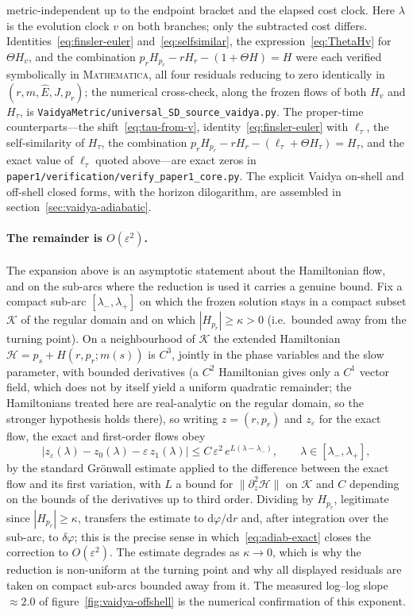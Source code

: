 \documentclass[12pt]{iopart}
\newcommand{\Ehat}{\hat E}
\newcommand{\dd}{\mathrm{d}}
\theoremstyle{plain}
\theoremstyle{definition}
\theoremstyle{plain}
\theoremstyle{remark}
\begin{document}
metric-independent up to the endpoint bracket and the elapsed cost clock. Here $\lambda$ is
the evolution clock $v$ on both branches; only the subtracted cost differs. Identities~\eqref{eq:finsler-euler}
and~\eqref{eq:selfsimilar}, the expression~\eqref{eq:ThetaHv} for $\Theta H_v$, and the
combination $p_rH_{p_r}-rH_r-(1+\Theta H)=H$ were each verified symbolically in
\textsc{Mathematica}, all four residuals reducing to zero identically in
$(r,m,\Ehat,J,p_r)$; the numerical cross-check, along the frozen flows of both $H_v$ and
$H_\tau$, is \texttt{VaidyaMetric/universal\_SD\_source\_vaidya.py}. The proper-time counterparts---the
shift~\eqref{eq:tau-from-v}, identity~\eqref{eq:finsler-euler} with $\ell_\tau$, the
self-similarity of $H_\tau$, the combination
$p_rH_{p_r}-rH_r-(\ell_\tau+\Theta H_\tau)=H_\tau$, and the exact value of $\ell_\tau$ quoted
above---are exact zeros in \texttt{paper1/verification/verify\_paper1\_core.py}. The explicit Vaidya on-shell and
off-shell closed forms, with the horizon dilogarithm, are assembled in
section~\ref{sec:vaidya-adiabatic}.

\paragraph{The remainder is $O(\varepsilon^2)$.} The expansion above is an asymptotic
statement about the Hamiltonian flow, and on the sub-arcs where the reduction is used it
carries a genuine bound. Fix a compact sub-arc $[\lambda_-,\lambda_+]$ on which the frozen
solution stays in a compact subset $\mathcal K$ of the regular domain and on which
$|H_{p_r}|\ge\kappa>0$ (i.e.\ bounded away from the turning point). On a neighbourhood of
$\mathcal K$ the extended Hamiltonian $\mathcal H=p_s+H(r,p_r;m(s))$ is $C^3$, jointly in
the phase variables and the slow parameter, with bounded derivatives (a $C^2$ Hamiltonian
gives only a $C^1$ vector field, which does not by itself yield a uniform quadratic
remainder; the Hamiltonians treated here are real-analytic on the regular domain, so the
stronger hypothesis holds there), so writing $z=(r,p_r)$ and $z_\varepsilon$ for the exact flow, the exact and
first-order flows obey
\[
   \big|z_\varepsilon(\lambda)-z_0(\lambda)-\varepsilon\,z_1(\lambda)\big|
   \le C\,\varepsilon^{2}\,e^{L(\lambda-\lambda_-)} ,
   \qquad \lambda\in[\lambda_-,\lambda_+],
\]
by the standard Gr\"onwall estimate applied to the difference between the exact flow and
its first variation, with $L$ a bound for $\|\partial_z^2\mathcal H\|$ on $\mathcal K$ and
$C$ depending on the bounds of the derivatives up to third order. Dividing by $H_{p_r}$, legitimate since
$|H_{p_r}|\ge\kappa$, transfers the estimate to $\dd\varphi/\dd r$ and, after integration
over the sub-arc, to $\delta\varphi$; this is the precise sense in
which~\eqref{eq:adiab-exact} closes the correction to $O(\varepsilon^2)$. The estimate
degrades as $\kappa\to0$, which is why the reduction is non-uniform at the turning point
and why all displayed residuals are taken on compact sub-arcs bounded away from it. The
measured log--log slope $\approx2.0$ of figure~\ref{fig:vaidya-offshell} is the numerical
confirmation of this exponent.
\end{document}
